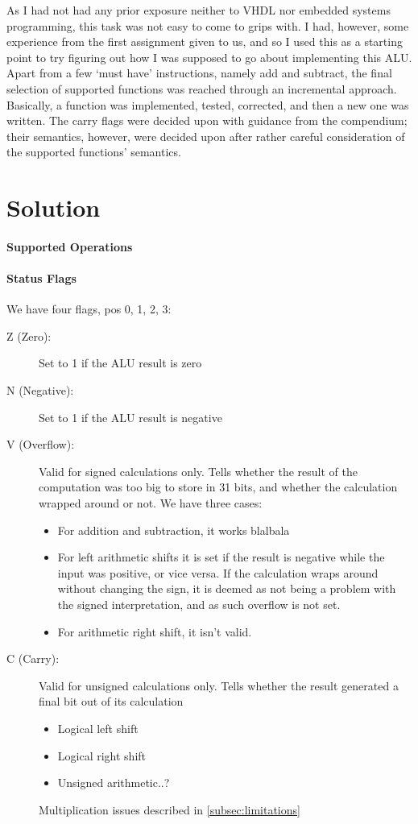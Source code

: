 \documentclass{article}
\begin{document}
As I had not had any prior exposure neither to VHDL nor embedded systems programming, this task was not easy to come to grips with. I had, however, some experience from the first assignment given to us, and so I used this as a starting point to try figuring out how I was supposed to go about implementing this ALU. Apart from a few `must have' instructions, namely add and subtract, the final selection of supported functions was reached through an incremental approach. Basically, a function was implemented, tested, corrected, and then a new one was written. The carry flags were decided upon with guidance from the compendium; their semantics, however, were decided upon after rather careful consideration of the supported functions' semantics. 

\section{Solution}
\label{sec:solution}

\paragraph{Supported Operations}
\label{ops}

\paragraph{Status Flags}
\label{flags}
We have four flags, pos 0, 1, 2, 3:
\begin{description}
\item[Z (Zero):] Set to 1 if the ALU result is zero
\item[N (Negative):] Set to 1 if the ALU result is negative
\item[V (Overflow):] Valid for signed calculations only. Tells whether the result of the computation was too big to store in 31 bits, and whether the calculation wrapped around or not. We have three cases:
\begin{itemize}
\item For addition and subtraction, it works blalbala
\item For left arithmetic shifts it is set if the result is negative while the input was positive, or vice versa. If the calculation wraps around without changing the sign, it is deemed as not being a problem with the signed interpretation, and as such overflow is not set.
\item  For arithmetic right shift, it isn't valid.
\end{itemize}
\item[C (Carry):] Valid for unsigned calculations only. Tells whether the result generated a final bit out of its calculation
\begin{itemize}
\item Logical left shift
\item Logical right shift
\item Unsigned arithmetic..?
\end{itemize}

Multiplication issues described in \ref{subsec:limitations}
\end{description}
\end{document}
